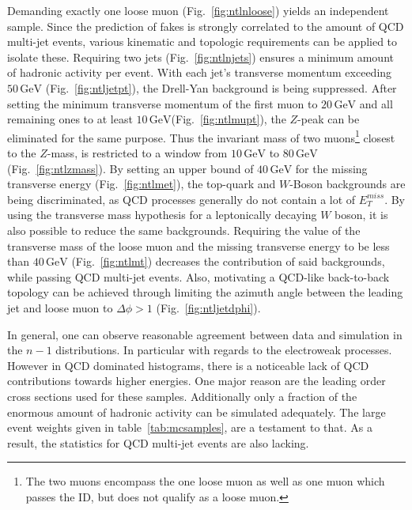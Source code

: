 Demanding exactly one loose muon (Fig.~\ref{fig:ntlnloose}) yields an independent sample. Since the prediction of fakes is strongly correlated to the amount of QCD multi-jet events, various kinematic and topologic requirements can be applied to isolate these. Requiring two jets (Fig.~\ref{fig:ntlnjets}) ensures a minimum amount of hadronic activity per event. With each jet's transverse momentum exceeding $50\,\text{GeV}$ (Fig.~\ref{fig:ntljetpt}), the Drell-Yan background is being suppressed. After setting the minimum transverse momentum of the first muon to $20\,\text{GeV}$ and all remaining ones to at least $10\,\text{GeV}$(Fig.~\ref{fig:ntlmupt}), the $Z$-peak can be eliminated for the same purpose. Thus the invariant mass of two muons\footnote{The two muons encompass the one loose muon as well as one muon which passes the ID, but does not qualify as a loose muon.} closest to the $Z$-mass, is restricted to a window from $10\,\text{GeV}$ to $80\,\text{GeV}$ (Fig.~\ref{fig:ntlzmass}). By setting an upper bound of $40\,\text{GeV}$ for the missing transverse energy (Fig.~\ref{fig:ntlmet}), the top-quark and $W$-Boson backgrounds are being discriminated, as QCD processes generally do not contain a lot of $E_{T}^{miss}$. By using the transverse mass hypothesis for a leptonically decaying $W$ boson, it is also possible to reduce the same backgrounds. Requiring the value of the transverse mass of the loose muon and the missing transverse energy to be less than $40\,\text{GeV}$ (Fig.~\ref{fig:ntlmt}) decreases the contribution of said backgrounds, while passing QCD multi-jet events. Also, motivating a QCD-like back-to-back topology can be achieved through limiting the azimuth angle between the leading jet and loose muon to $\Delta \phi > 1$ (Fig.~\ref{fig:ntljetdphi}).

In general, one can observe reasonable agreement between data and simulation in the $n - 1$ distributions. In particular with regards to the electroweak processes. However in QCD dominated histograms, there is a noticeable lack of QCD contributions towards higher energies. One major reason are the leading order cross sections used for these samples. Additionally only a fraction of the enormous amount of hadronic activity can be simulated adequately. The large event weights given in table~\ref{tab:mcsamples}, are a testament to that. As a result, the statistics for QCD multi-jet events are also lacking.

